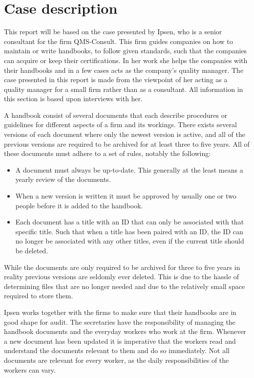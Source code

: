 \section{Case description} \label{sec:CaseDescription}

This report will be based on the case presented by Ipsen, who is a senior consultant for the firm QMS-Consult.
This firm guides companies on how to maintain or write handbooks, to follow given standards, such that the companies can acquire or keep their certifications.
In her work she helps the companies with their handbooks and in a few cases acts as the company's quality manager.
The case presented in this report is made from the viewpoint of her acting as a quality manager for a small firm rather than as a consultant.
All information in this section is based upon interviews with her.

A handbook consist of several documents that each describe procedures or guidelines for different aspects of a firm and its workings.
There exists several versions of each document where only the newest version is active, and all of the previous versions are required to be archived for at least three to five years. All of these documents must adhere to a set of rules, notably the following:

\begin{itemize}
	\item
	A document must always be up-to-date.
	This generally at the least means a yearly review of the documents.
	\item
	When a new version is written it must be approved by usually one or two people before it is added to the handbook.
	\item
	Each document has a title with an ID that can only be associated with that specific title.
	Such that when a title has been paired with an ID, the ID can no longer be associated with any other titles, even if the current title should be deleted.
\end{itemize}

While the documents are only required to be archived for three to five years in reality previous versions are seldomly ever deleted.
This is due to the hassle of determining files that are no longer needed and due to the relatively small space required to store them.

Ipsen works together with the firms to make sure that their handbooks are in good shape for audit.
The secretaries have the responsibility of managing the handbook documents and the everyday workers who work at the firm.
Whenever a new document has been updated it is imperative that the workers read and understand the documents relevant to them and do so immediately.
Not all documents are relevant for every worker, as the daily responsibilities of the workers can vary.

